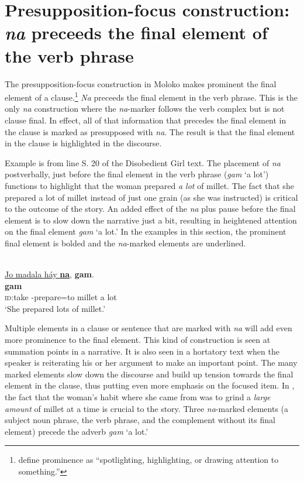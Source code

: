 \section{Presupposition-focus construction: \textit{na} preceeds the final element of the verb phrase}\label{sec:11.5}
\hypertarget{RefHeading1213301525720847}{}
The presupposition-focus construction in Moloko makes prominent the final element of a clause.\footnote{\citet[221]{LongacreHwang2012} define prominence as “spotlighting, highlighting, or drawing attention to something.”} \textit{Na} preceeds the final element in the verb phrase. This is the only \textit{na} construction where the \textit{na}{}-marker follows the verb complex but is not clause final. In effect, all of that information that precedes the final element in the clause is marked as presupposed with \textit{na}. The result is that the final element in the clause is highlighted in the discourse.

Example  is from line S. 20 of the Disobedient Girl text. The placement of \textit{na} postverbally, just before the final element in the verb phrase (\textit{gam} ‘a lot’) functions to highlight that the woman prepared \textit{a lot} of millet. The fact that she prepared a lot of millet instead of just one grain (as she was instructed) is critical to the outcome of the story. An added effect of the \textit{na} plus pause before the final element is to slow down the narrative just a bit, resulting in heightened attention on the final element \textit{gam} ‘a lot.’ In the examples in this section, the prominent final element is bolded and the \textit{na}-marked elements are underlined.

\ea \label{ex:11:45}\\
\underline{Jo  madala  háy  \textbf{na}},  \textbf{gam}.\\
\gll  {}       \textbf{gam}\\
      \textsc{id}:take  {\NOM}-prepare=to  millet  {\PSP} {a lot}\\
\glt  ‘She prepared lots of millet.'
\z

Multiple elements in a clause or sentence that are marked with \textit{na} will add even more prominence to the final element. This kind of construction is seen at summation points in a narrative. It is also seen in a hortatory text when the speaker is reiterating his or her argument to make an important point. The many marked elements slow down the discourse and build up tension towards the final element in the clause, thus putting even more emphasis on the focused item. In , the fact that the woman’s habit where she came from was to grind a \textit{large amount} of millet at a time is crucial to the story. Three \textit{na}-marked elements (a subject noun phrase, the verb phrase, and the complement without its final element) precede the adverb \textit{gam} ‘a lot.’


